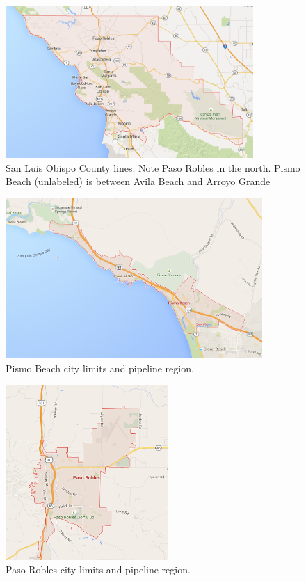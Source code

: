 \begin{figure}
    \centering
    \includegraphics[width=0.84\textwidth]{figures/county.png}
    \caption{San Luis Obispo County lines. Note Paso Robles in the north. Pismo Beach (unlabeled) is between Avila Beach and Arroyo Grande}
    \label{fig:permissions}
\end{figure}

\begin{figure}
    \centering
    \includegraphics[width=0.87\textwidth]{figures/pismo.png}
    \caption{Pismo Beach city limits and pipeline region.}
    \label{fig:permissions}
\end{figure}

\begin{figure}
    \centering
    \includegraphics[width=0.55\textwidth]{figures/paso.png}
    \caption{Paso Robles city limits and pipeline region.}
    \label{fig:permissions}
\end{figure}

